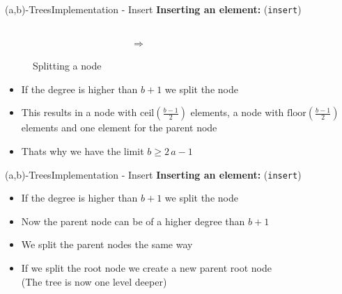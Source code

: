 \begin{frame}{(a,b)-Trees}{Implementation - Insert}
  \textbf{Inserting an element:} (\texttt{\color{MainA}insert})
    \begin{figure}
    \begin{columns}
      \begin{column}{0.35\linewidth}
        \begin{adjustbox}{width=\linewidth}
          
        \end{adjustbox}
      \end{column}
      \begin{column}{0.1\linewidth}
        \begin{center}
          $\Rightarrow$
        \end{center}
      \end{column}
      \begin{column}{0.35\linewidth}
        \begin{adjustbox}{width=\linewidth}
          
        \end{adjustbox}
      \end{column}
    \end{columns}
    \caption{Splitting a node}
    \label{fig:a_b_tree:insert_node_split}
    \end{figure}
    \vspace{-1.0em}
  \begin{itemize}
    \item<2->
      If the degree is higher than {\color{MainA}$b+1$}
      we split the node
    \item<3->
      This results in a node with
      {\color{MainA}$\mathrm{ceil}\left(\frac{b-1}{2}\right)$} elements,
      a node with
      {\color{MainA}$\mathrm{floor}\left(\frac{b-1}{2}\right)$} elements
      and one element for the parent node
    \item<4->
      Thats why we have the limit {\color{MainA}$b \geq 2\,a - 1$}
  \end{itemize}
\end{frame}


\begin{frame}{(a,b)-Trees}{Implementation - Insert}
  \textbf{Inserting an element:} (\texttt{\color{MainA}insert})
  \begin{itemize}
    \item<2->
      If the degree is higher than {\color{MainA}$b+1$}
      we split the node
    \item<3->
      Now the parent node can be of a higher degree than
      {\color{MainA}$b+1$}
    \item<4->
      We {\color{MainA}split} the parent nodes the same way
    \item<5->
      If we split the root node we create a new parent root node\\
      (The tree is now one level deeper)
  \end{itemize}
\end{frame}

